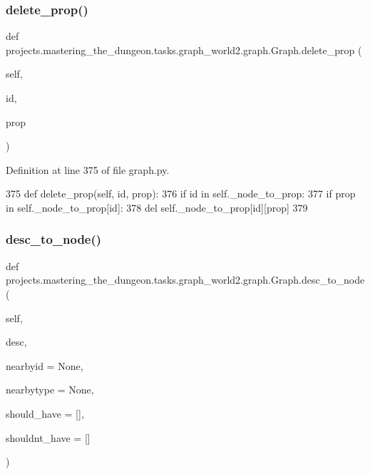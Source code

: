 \subsubsection{\texorpdfstring{delete\+\_\+prop()}{delete\_prop()}}
{\footnotesize\ttfamily def projects.\+mastering\+\_\+the\+\_\+dungeon.\+tasks.\+graph\+\_\+world2.\+graph.\+Graph.\+delete\+\_\+prop (\begin{DoxyParamCaption}\item[{}]{self,  }\item[{}]{id,  }\item[{}]{prop }\end{DoxyParamCaption})}



Definition at line 375 of file graph.\+py.


\begin{DoxyCode}
375     \textcolor{keyword}{def }delete\_prop(self, id, prop):
376         \textcolor{keywordflow}{if} id \textcolor{keywordflow}{in} self.\_node\_to\_prop:
377             \textcolor{keywordflow}{if} prop \textcolor{keywordflow}{in} self.\_node\_to\_prop[id]:
378                 del self.\_node\_to\_prop[id][prop]
379 
\end{DoxyCode}
\mbox{\label{classprojects_1_1mastering__the__dungeon_1_1tasks_1_1graph__world2_1_1graph_1_1Graph_a42fff07b3f21289c9b360adf0d37d231}} 
\subsubsection{\texorpdfstring{desc\+\_\+to\+\_\+node()}{desc\_to\_node()}}
{\footnotesize\ttfamily def projects.\+mastering\+\_\+the\+\_\+dungeon.\+tasks.\+graph\+\_\+world2.\+graph.\+Graph.\+desc\+\_\+to\+\_\+node (\begin{DoxyParamCaption}\item[{}]{self,  }\item[{}]{desc,  }\item[{}]{nearbyid = {\ttfamily None},  }\item[{}]{nearbytype = {\ttfamily None},  }\item[{}]{should\+\_\+have = {\ttfamily \mbox{[}\mbox{]}},  }\item[{}]{shouldnt\+\_\+have = {\ttfamily \mbox{[}\mbox{]}} }\end{DoxyParamCaption})}



